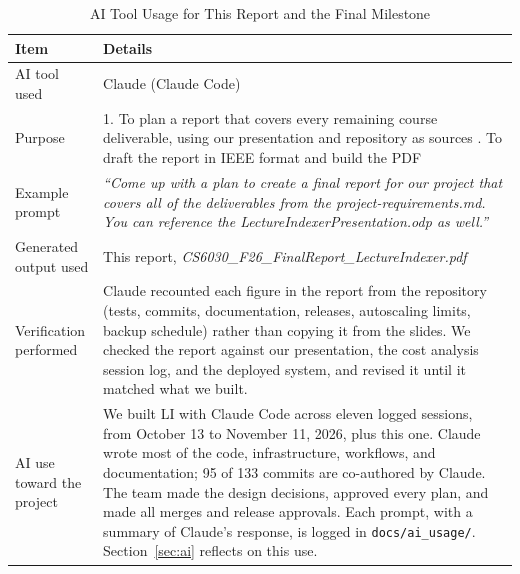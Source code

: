 \documentclass[conference]{IEEEtran}
\begin{document}
\begin{table}[h]
\caption{AI Tool Usage for This Report and the Final Milestone}
\label{tab:ai}
\centering\small
\renewcommand{\arraystretch}{1.4}
\begin{tabularx}{\textwidth}{@{}p{3.6cm}X@{}}
\toprule
\textbf{Item} & \textbf{Details} \\
\midrule
AI tool used & Claude (Claude Code) \\
Purpose & 1. To plan a report that covers every remaining course deliverable, using our presentation and repository as sources \newline
2. To draft the report in IEEE format and build the PDF \\
Example prompt & \textit{``Come up with a plan to create a final report for our project that covers all of the deliverables from the project-requirements.md. You can reference the LectureIndexerPresentation.odp as well.''} \\
Generated output used & This report, \textit{CS6030\_F26\_FinalReport\_LectureIndexer.pdf} \\
Verification performed & Claude recounted each figure in the report from the repository (tests, commits, documentation, releases, autoscaling limits, backup schedule) rather than copying it from the slides. We checked the report against our presentation, the cost analysis session log, and the deployed system, and revised it until it matched what we built. \\
AI use toward the project & We built LI with Claude Code across eleven logged sessions, from October 13 to November 11, 2026, plus this one. Claude wrote most of the code, infrastructure, workflows, and documentation; 95 of 133 commits are co-authored by Claude. The team made the design decisions, approved every plan, and made all merges and release approvals. Each prompt, with a summary of Claude's response, is logged in \texttt{docs/ai\_usage/}. Section~\ref{sec:ai} reflects on this use. \\
\bottomrule
\end{tabularx}
\end{table}
\end{document}
